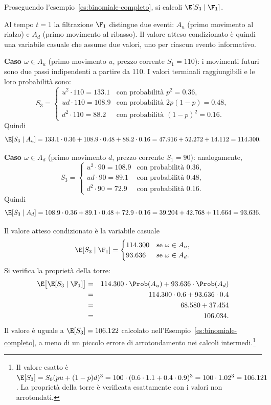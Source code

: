 \begin{example}
\label{es:cond-filtrazione}
Proseguendo l'esempio~\ref{es:binomiale-completo}, si calcoli
$\E[S_3\mid\F_1]$.

Al tempo $t=1$ la filtrazione $\F_1$ distingue due eventi: $A_u$
(primo movimento al rialzo) e $A_d$ (primo movimento al ribasso).
Il valore atteso condizionato \`{e} quindi una variabile casuale
che assume due valori, uno per ciascun evento informativo.

\smallskip
\noindent
\textbf{Caso $\omega\in A_u$} (primo movimento $u$, prezzo corrente
$S_1=110$): i movimenti futuri sono due passi indipendenti a partire
da 110. I valori terminali raggiungibili e le loro probabilit\`{a}
sono:
\[
S_3=\begin{cases}
u^2\cdot 110=133.1 & \text{con probabilit\`{a} }p^2=0.36,\\
ud\cdot 110=108.9 & \text{con probabilit\`{a} }2p(1-p)=0.48,\\
d^2\cdot 110=88.2 & \text{con probabilit\`{a} }(1-p)^2=0.16.
\end{cases}
\]
Quindi
\[
\E[S_3\mid A_u]=133.1\cdot 0.36+108.9\cdot 0.48+88.2\cdot 0.16
=47.916+52.272+14.112=114.300.
\]

\smallskip
\noindent
\textbf{Caso $\omega\in A_d$} (primo movimento $d$, prezzo corrente
$S_1=90$): analogamente,
\[
S_3=\begin{cases}
u^2\cdot 90=108.9 & \text{con probabilit\`{a} }0.36,\\
ud\cdot 90=89.1 & \text{con probabilit\`{a} }0.48,\\
d^2\cdot 90=72.9 & \text{con probabilit\`{a} }0.16.
\end{cases}
\]
Quindi
\[
\E[S_3\mid A_d]=108.9\cdot 0.36+89.1\cdot 0.48+72.9\cdot 0.16
=39.204+42.768+11.664=93.636.
\]

\smallskip
Il valore atteso condizionato \`{e} la variabile casuale
\[
\E[S_3\mid\F_1]=\begin{cases}
114.300 & \text{se }\omega\in A_u,\\
93.636 & \text{se }\omega\in A_d.
\end{cases}
\]
Si verifica la propriet\`{a} della torre:
\begin{eqnarray*}
\E\bigl[\E[S_3\mid\F_1]\bigr]
&=& 114.300\cdot\Prob(A_u)+93.636\cdot\Prob(A_d)\\
&=& 114.300\cdot 0.6+93.636\cdot 0.4\\
&=& 68.580+37.454\\
&=& 106.034.
\end{eqnarray*}
Il valore \`{e} uguale a $\E[S_3]=106.122$ calcolato
nell'Esempio~\ref{es:binomiale-completo}, a meno di un piccolo errore
di arrotondamento nei calcoli intermedi.\footnote{Il valore esatto
\`{e} $\E[S_3]=S_0(pu+(1-p)d)^3=100\cdot(0.6\cdot
1.1+0.4\cdot 0.9)^3=100\cdot 1.02^3=106.121$. La propriet\`{a}
della torre \`{e} verificata esattamente con i valori non arrotondati.}
\end{example}

